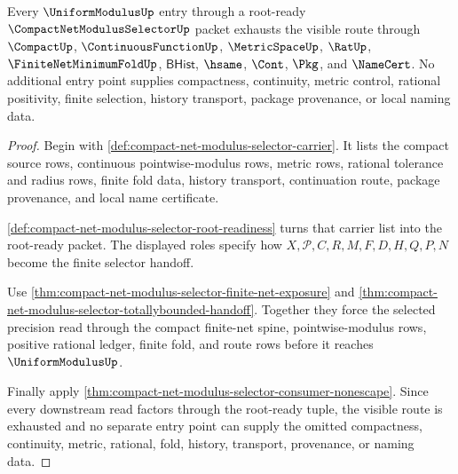 \begin{theorem}
\label{thm:compact-net-modulus-selector-uniform-modulus-entry-exhaustion}
Every $\UniformModulusUp$ entry through a root-ready $\CompactNetModulusSelectorUp$ packet exhausts the visible route through $\CompactUp$, $\ContinuousFunctionUp$, $\MetricSpaceUp$, $\RatUp$, $\FiniteNetMinimumFoldUp$, $\mathsf{BHist}$, $\hsame$, $\Cont$, $\Pkg$, and $\NameCert$. No additional entry point supplies compactness, continuity, metric control, rational positivity, finite selection, history transport, package provenance, or local naming data.
\end{theorem}
\begin{proof}
Begin with \autoref{def:compact-net-modulus-selector-carrier}. It lists the compact source rows, continuous pointwise-modulus rows, metric rows, rational tolerance and radius rows, finite fold data, history transport, continuation route, package provenance, and local name certificate.

\autoref{def:compact-net-modulus-selector-root-readiness} turns that carrier list into the root-ready packet. The displayed roles specify how $X,\mathcal{P},C,R,M,F,D,H,Q,P,N$ become the finite selector handoff.

Use \autoref{thm:compact-net-modulus-selector-finite-net-exposure} and \autoref{thm:compact-net-modulus-selector-totallybounded-handoff}. Together they force the selected precision read through the compact finite-net spine, pointwise-modulus rows, positive rational ledger, finite fold, and route rows before it reaches $\UniformModulusUp$.

Finally apply \autoref{thm:compact-net-modulus-selector-consumer-nonescape}. Since every downstream read factors through the root-ready tuple, the visible route is exhausted and no separate entry point can supply the omitted compactness, continuity, metric, rational, fold, history, transport, provenance, or naming data.
\end{proof}



